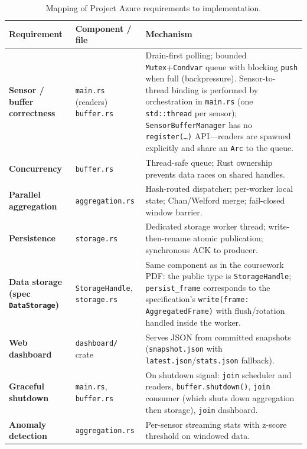 \documentclass[11pt]{article}
\begin{document}
\FloatBarrier
\begin{table}[!htbp]
\centering
\small
\caption{Mapping of Project Azure requirements to implementation.}
\label{tab:rubric}
\begin{tabular}{@{}p{3cm}p{4cm}p{5.5cm}@{}}
\toprule
\textbf{Requirement} & \textbf{Component / file} & \textbf{Mechanism} \\ \midrule
\textbf{Sensor / buffer correctness} & \texttt{main.rs} (readers) \newline \texttt{buffer.rs} & Drain-first polling; bounded \texttt{Mutex}+\texttt{Condvar} queue with blocking \texttt{push} when full (backpressure). Sensor-to-thread binding is performed by orchestration in \texttt{main.rs} (one \texttt{std::thread} per sensor); \texttt{SensorBufferManager} has no \texttt{register(\ldots)} API---readers are spawned explicitly and share an \texttt{Arc} to the queue. \\ \addlinespace
\textbf{Concurrency} & \texttt{buffer.rs} & Thread-safe queue; Rust ownership prevents data races on shared handles. \\ \addlinespace
\textbf{Parallel aggregation} & \texttt{aggregation.rs} & Hash-routed dispatcher; per-worker local state; Chan/Welford merge; fail-closed window barrier. \\ \addlinespace
\textbf{Persistence} & \texttt{storage.rs} & Dedicated storage worker thread; write-then-rename atomic publication; synchronous ACK to producer. \\ \addlinespace
\textbf{Data storage (spec \texttt{DataStorage})} & \texttt{StorageHandle}, \texttt{storage.rs} & Same component as in the coursework PDF: the public type is \texttt{StorageHandle}; \texttt{persist\_frame} corresponds to the specification's \texttt{write(frame: AggregatedFrame)} with flush/rotation handled inside the worker. \\ \addlinespace
\textbf{Web dashboard} & \texttt{dashboard/} crate & Serves JSON from committed snapshots (\texttt{snapshot.json} with \texttt{latest.json}/\texttt{stats.json} fallback). \\ \addlinespace
\textbf{Graceful shutdown} & \texttt{main.rs}, \texttt{buffer.rs} & On shutdown signal: \texttt{join} scheduler and readers, \texttt{buffer.shutdown()}, \texttt{join} consumer (which shuts down aggregation then storage), \texttt{join} dashboard. \\ \addlinespace
\textbf{Anomaly detection} & \texttt{aggregation.rs} & Per-sensor streaming stats with z-score threshold on windowed data. \\ \bottomrule
\end{tabular}
\end{table}
\FloatBarrier
\end{document}
